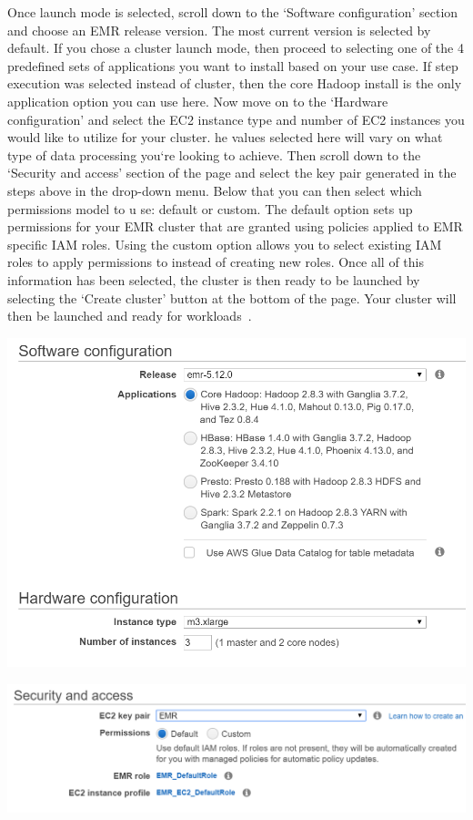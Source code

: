 Once launch mode is selected, scroll down to the `Software configuration' 
section and choose an EMR release version. The most current version is 
selected by default. If you chose a cluster launch mode, then proceed to 
selecting one of the 4 predefined sets of applications you want to install 
based on your use case. If step execution was selected instead of cluster, 
then the core Hadoop install is the only application option you can use 
here. Now move on to the `Hardware configuration' and select the EC2 instance 
type and number of EC2 instances you would like to utilize for your cluster. 
he values selected here will vary on what type of data processing you`re 
looking to achieve. Then scroll down to the `Security and access' section 
of the page and select the key pair generated in the steps above in the 
drop-down menu. Below that you can then select which permissions model to u
se: default or custom. The default option sets up permissions for your EMR 
cluster that are granted using policies applied to EMR specific IAM roles. 
Using the custom option allows you to select existing IAM roles to apply 
permissions to instead of creating new roles. Once all of this information 
has been selected, the cluster is then ready to be launched by selecting 
the `Create cluster' button at the bottom of the page. Your cluster will 
then be launched and ready for workloads~\cite{hid-sp18-521-emrlaunch}. 

\centering\includegraphics[width=\columnwidth]{../images/emr_software_config.png}

\centering\includegraphics[width=\columnwidth]{../images/emr_security.png}

